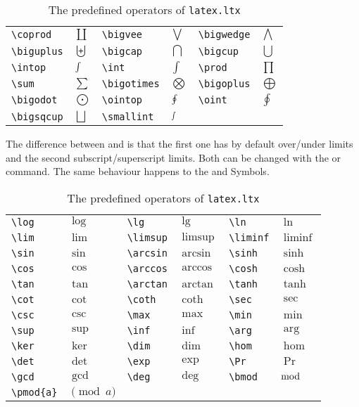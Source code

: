 \begin{table}[htb]
\begin{table}[htb]
\centering
\begin{tabular}{llllll}
\verb+\coprod+  &$\coprod$  &\verb+\bigvee+   &$\bigvee$   &\verb+\bigwedge+&$\bigwedge$\\
\verb+\biguplus+&$\biguplus$&\verb+\bigcap+   &$\bigcap$   &\verb+\bigcup+  &$\bigcup$   \\
\verb+\intop+   &$\intop$   &\verb+\int+      &$\int$      &\verb+\prod+    &$\prod$ \\
\verb+\sum+     &$\sum$     &\verb+\bigotimes+&$\bigotimes$&\verb+\bigoplus+&$\bigoplus$\\
\verb+\bigodot+ &$\bigodot$ &\verb+\ointop+   &$\ointop$   &\verb+\oint+    &$\oint$\\
\verb+\bigsqcup+&$\bigsqcup$&\verb+\smallint+ &$\smallint$
\end{tabular}
\caption{The predefined operators of \texttt{fontmath.ltx}}\label{tab:operator}
\end{table}
The difference between  and  is that the first one has by default
over/under limits and the second subscript/superscript limits. Both can be changed
with the  or  command. The same behaviour happens to the
 and  Symbols.

\begin{table}[htb]
\centering
\begin{tabular}{llllll}
\verb+\log+   & $\log$    &\verb+\lg+     & $\lg$      &\verb+\ln+     & $\ln$     \\
\verb+\lim+   & $\lim$    &\verb+\limsup+ & $\limsup$  &\verb+\liminf+ & $\liminf$ \\
\verb+\sin+   & $\sin$    &\verb+\arcsin+ & $\arcsin$  &\verb+\sinh+   & $\sinh$   \\
\verb+\cos+   & $\cos$    &\verb+\arccos+ & $\arccos$  &\verb+\cosh+   & $\cosh$   \\
\verb+\tan+   & $\tan$    &\verb+\arctan+ & $\arctan$  &\verb+\tanh+   & $\tanh$   \\
\verb+\cot+   & $\cot$    &\verb+\coth+   & $\coth$    &\verb+\sec+    & $\sec$    \\
\verb+\csc+   & $\csc$    &\verb+\max+    & $\max$     &\verb+\min+    & $\min$    \\
\verb+\sup+   & $\sup$    &\verb+\inf+    & $\inf$     &\verb+\arg+    & $\arg$    \\
\verb+\ker+   & $\ker$    &\verb+\dim+    & $\dim$     &\verb+\hom+    & $\hom$    \\
\verb+\det+   & $\det$    &\verb+\exp+    & $\exp$     &\verb+\Pr+     & $\Pr$     \\
\verb+\gcd+   & $\gcd$    &\verb+\deg+    & $\deg$     &\verb+\bmod+   & $\bmod$   \\
\verb+\pmod{a}+& $\pmod{a}$
\end{tabular}
\caption{The predefined operators of \texttt{latex.ltx}}\label{tab:operator2}
\end{table}



\end{table}
